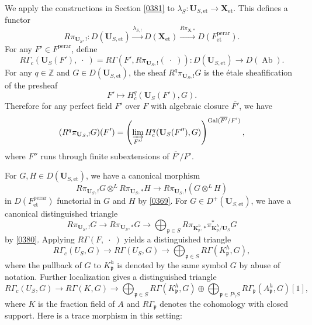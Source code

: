\documentclass{amsart}
\theoremstyle{remark}
\numberwithin{equation}{subsection}
\newcommand{\tensor}{\mathbin{\otimes}}
\newcommand{\closure}[1]{\overline{#1}}
\newcommand{\Z}{\mathbb{Z}}
\newcommand{\et}{\mathrm{et}}
\newcommand{\dirlim}{\varinjlim}
\newcommand{\perar}{\mathrm{perar}}
\newcommand{\alg}[1]{\mathbf{#1}}
\newcommand{\var}{\;\cdot\;}
\newcommand{\ideal}[1]{\mathfrak{#1}}
\DeclareMathOperator{\Gal}{Gal}
\DeclareMathOperator{\Ab}{Ab}
\begin{document}
We apply the constructions in Section \ref{0381} to $\lambda_{S} \colon \alg{U}_{S, \et} \to \alg{X}_{\et}$.
This defines a functor
	\[
			R \pi_{\alg{U}_{S}, !}
		\colon
			D(\alg{U}_{S, \et})
		\stackrel{\lambda_{S, !}}{\longrightarrow}
			D(\alg{X}_{\et})
		\stackrel{R \pi_{\alg{X}, \ast}}{\longrightarrow}
			D(F^{\perar}_{\et}).
	\]
For any $F' \in F^{\perar}$, define
	\[
			R \Gamma_{c}(\alg{U}_{S}(F'), \var)
		=
			R \Gamma(F', R \pi_{\alg{U}_{S}, !}(\var))
		\colon
			D(\alg{U}_{S, \et})
		\to
			D(\Ab).
	\]
For any $q \in \Z$ and $G \in D(\alg{U}_{S, \et})$,
the sheaf $R^{q} \pi_{\alg{U}_{S}, !} G$ is the \'etale sheafification of the presheaf
	\[
			F'
		\mapsto
			H_{c}^{q}(\alg{U}_{S}(F'), G).
	\]
Therefore for any perfect field $F'$ over $F$ with algebraic closure $\closure{F'}$,
we have
	\[
			(R^{q} \pi_{\alg{U}_{S}, !} G)(F')
		=
			\left(
				\dirlim_{F''}
					H_{c}^{q}(\alg{U}_{S}(F''), G)
			\right)^{\Gal(\closure{F'} / F')},
	\]
where $F''$ runs through finite subextensions of $\closure{F'} / F'$.

For $G, H \in D(\alg{U}_{S, \et})$,
we have a canonical morphism
	\begin{equation} \label{0396}
			R \pi_{\alg{U}_{S}, !} G \tensor^{L} R \pi_{\alg{U}_{S}, \ast} H
		\to
			R \pi_{\alg{U}_{S}, !}(G \tensor^{L} H)
	\end{equation}
in $D(F^{\perar}_{\et})$ functorial in $G$ and $H$
by \eqref{0369}.
For $G \in D^{+}(\alg{U}_{S, \et})$, we have a canonical distinguished triangle
	\begin{equation} \label{0110}
			R \pi_{\alg{U}_{S}, !} G
		\to
			R \pi_{\alg{U}_{S}, \ast} G
		\to
			\bigoplus_{\ideal{p} \in S}
				R \pi_{\alg{K}_{\ideal{p}}^{h}, \ast}
				\pi_{\alg{K}_{\ideal{p}}^{h} / \alg{U}_{S}}^{\ast} G
	\end{equation}
by \eqref{0380}.
Applying $R \Gamma(F, \var)$ yields a distinguished triangle
	\[
			R \Gamma_{c}(U_{S}, G)
		\to
			R \Gamma(U_{S}, G)
		\to
			\bigoplus_{\ideal{p} \in S}
				R \Gamma(K_{\ideal{p}}^{h}, G),
	\]
where the pullback of $G$ to $K_{\ideal{p}}^{h}$ is denoted
by the same symbol $G$ by abuse of notation.
Further localization gives a distinguished triangle
	\[
			R \Gamma_{c}(U_{S}, G)
		\to
			R \Gamma(K, G)
		\to
				\bigoplus_{\ideal{p} \in S}
					R \Gamma(K_{\ideal{p}}^{h}, G)
			\oplus
				\bigoplus_{\ideal{p} \in P \setminus S}
					R \Gamma_{\ideal{p}}(A_{\ideal{p}}^{h}, G)[1],
	\]
where $K$ is the fraction field of $A$ and
$R \Gamma_{\ideal{p}}$ denotes the cohomology with closed support.
Here is a trace morphism in this setting:
\end{document}
